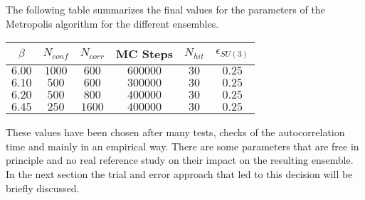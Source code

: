 The following table summarizes the final values for the parameters of the Metropolis algorithm for the different ensembles.
\begin{table}[!htb]
    \begin{center}
    \begin{tabular}{cccccc}
        $\beta$ & $N_{conf}$ & $N_{corr}$ & MC Steps & $N_{hit}$ & $\epsilon_{SU(3)}$\\\hline
        $6.00$ & $1000$ & $600$ & $600000$ & $30$ & $0.25$\\
        $6.10$ & $500$ & $600$ & $300000$ & $30$ & $0.25$\\
        $6.20$ & $500$ & $800$ & $400000$ & $30$ & $0.25$\\
        $6.45$ & $250$ & $1600$ & $400000$ & $30$ & $0.25$
    \end{tabular}
    \label{runs:mcparams} 
    \end{center}
\end{table}
These values have been chosen after many tests, checks of the autocorrelation time and mainly in an empirical way. There are some parameters that are free in principle and no real reference study on their impact on the resulting ensemble. In the next section the trial and error approach that led to this decision will be briefly discussed.

